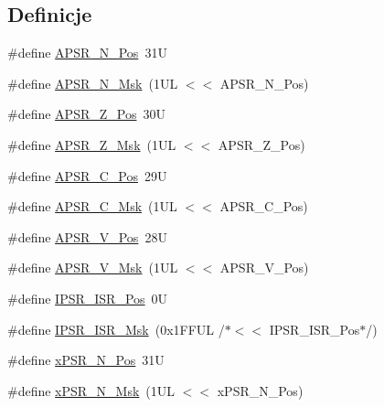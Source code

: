 \subsection*{Definicje}
\begin{DoxyCompactItemize}
\item 
\#define \hyperlink{group___c_m_s_i_s___c_o_r_e_gac469528d210043c7bd3f12f0e6824766}{A\+P\+S\+R\+\_\+\+N\+\_\+\+Pos}~31U
\item 
\#define \hyperlink{group___c_m_s_i_s___c_o_r_e_gadbc2cf55a026f661b53fadfcf822cef1}{A\+P\+S\+R\+\_\+\+N\+\_\+\+Msk}~(1\+U\+L $<$$<$ A\+P\+S\+R\+\_\+\+N\+\_\+\+Pos)
\item 
\#define \hyperlink{group___c_m_s_i_s___c_o_r_e_ga3661286d108b1aca308d7445685eae3a}{A\+P\+S\+R\+\_\+\+Z\+\_\+\+Pos}~30U
\item 
\#define \hyperlink{group___c_m_s_i_s___c_o_r_e_ga1deb4d1aa72bb83d1f79329406f15711}{A\+P\+S\+R\+\_\+\+Z\+\_\+\+Msk}~(1\+U\+L $<$$<$ A\+P\+S\+R\+\_\+\+Z\+\_\+\+Pos)
\item 
\#define \hyperlink{group___c_m_s_i_s___c_o_r_e_ga6cf72aa6f09a168f9e5beda1a4a887b9}{A\+P\+S\+R\+\_\+\+C\+\_\+\+Pos}~29U
\item 
\#define \hyperlink{group___c_m_s_i_s___c_o_r_e_ga6d47803fbad455bc10bd1ce59f2f335d}{A\+P\+S\+R\+\_\+\+C\+\_\+\+Msk}~(1\+U\+L $<$$<$ A\+P\+S\+R\+\_\+\+C\+\_\+\+Pos)
\item 
\#define \hyperlink{group___c_m_s_i_s___c_o_r_e_gac62830f67679ccd11658c4172c3e6ea7}{A\+P\+S\+R\+\_\+\+V\+\_\+\+Pos}~28U
\item 
\#define \hyperlink{group___c_m_s_i_s___c_o_r_e_ga33305d6701356bff6890b315fe8b5489}{A\+P\+S\+R\+\_\+\+V\+\_\+\+Msk}~(1\+U\+L $<$$<$ A\+P\+S\+R\+\_\+\+V\+\_\+\+Pos)
\item 
\#define \hyperlink{group___c_m_s_i_s___c_o_r_e_ga0e34027584d02c43811ae908a5ca9adf}{I\+P\+S\+R\+\_\+\+I\+S\+R\+\_\+\+Pos}~0U
\item 
\#define \hyperlink{group___c_m_s_i_s___c_o_r_e_gaf013a4579a64d1f21f56ea9f1b33ab56}{I\+P\+S\+R\+\_\+\+I\+S\+R\+\_\+\+Msk}~(0x1\+F\+F\+U\+L /$\ast$$<$$<$ I\+P\+S\+R\+\_\+\+I\+S\+R\+\_\+\+Pos$\ast$/)
\item 
\#define \hyperlink{group___c_m_s_i_s___c_o_r_e_ga031eb1b8ebcdb3d602d0b9f2ec82a7ae}{x\+P\+S\+R\+\_\+\+N\+\_\+\+Pos}~31U
\item 
\#define \hyperlink{group___c_m_s_i_s___c_o_r_e_gaf600f4ff41b62cf2f3b0a59b6d2e93d6}{x\+P\+S\+R\+\_\+\+N\+\_\+\+Msk}~(1\+U\+L $<$$<$ x\+P\+S\+R\+\_\+\+N\+\_\+\+Pos)
\item 
$$
\end{DoxyCompactItemize}
